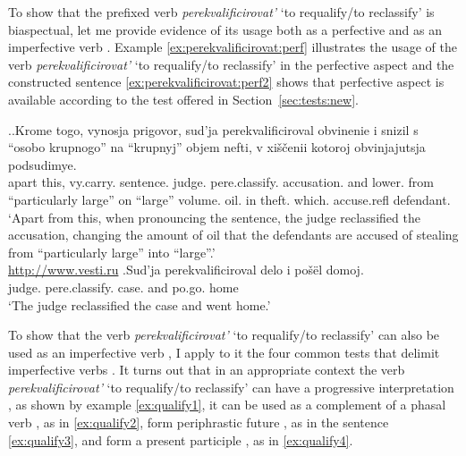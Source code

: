To show that the prefixed verb \textit{perekvalificirovat'} `to requalify/to reclassify' is  biaspectual, let me provide evidence of its usage both as a perfective and as an imperfective verb . Example \ref{ex:perekvalificirovat:perf} illustrates the usage of the verb \textit{perekvalificirovat'} `to requalify/to reclassify' in the perfective aspect and the constructed sentence \ref{ex:perekvalificirovat:perf2} shows that perfective aspect is available according to the test offered in Section~\ref{sec:tests:new}.

\ex.\ag.\label{ex:perekvalificirovat:perf}Krome togo, vynosja prigovor, sud'ja perekvalificiroval\textsuperscript{\PF} obvinenie i snizil s ``osobo krupnogo'' na ``krupnyj'' objem nefti, v xi\v{s}\v{c}enii kotoroj obvinjajutsja podsudimye.\\
apart this, vy.carry. sentence. judge. pere.classify. accusation. and lower. from ``particularly large'' on ``large'' volume. oil. in theft. which. accuse.refl defendant.\\
\trans `Apart from this, when pronouncing the sentence, the judge reclassified the accusation, changing the amount of oil that the defendants are accused of stealing from ``particularly large'' into ``large''.'\\
\hbox{}\hfill\hbox{\url{http://www.vesti.ru}}
\bg.\label{ex:perekvalificirovat:perf2}Sud'ja perekvalificiroval\textsuperscript{\PF} delo i po\v{s}\"{e}l domoj.\\
judge. pere.classify. case. and po.go. home\\
\trans `The judge reclassified the case and went home.'

To show that the verb \textit{perekvalificirovat'} `to requalify/to reclassify' can also be used as an imperfective verb , I apply to it the four common tests that delimit imperfective  verbs . It turns out that in an appropriate context   the verb \textit{perekvalificirovat'} `to requalify/to reclassify' can have a progressive interpretation , as shown by example \ref{ex:qualify1}, it can be used as a complement of a phasal verb , as in \ref{ex:qualify2}, form periphrastic future , as in the sentence \ref{ex:qualify3}, and form a present participle , as in \ref{ex:qualify4}. 

